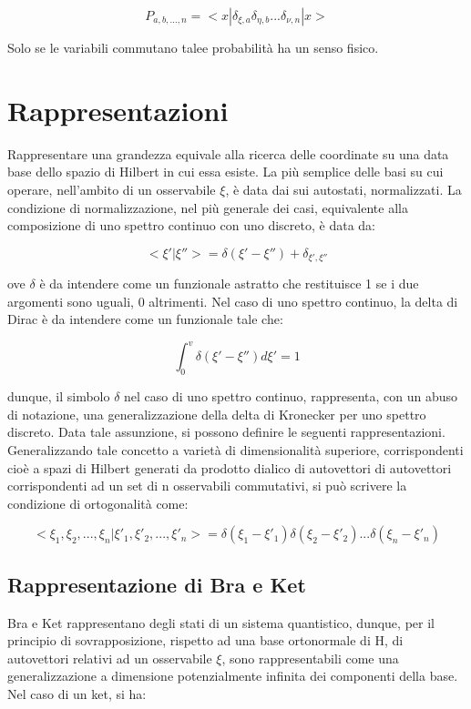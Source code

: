 \documentclass{article}
\begin{document}
\begin{equation}
  P_{a,b,...,n}=<x|\delta_{\xi,a}\delta_{\eta,b}...\delta_{\nu,n}|x>
\end{equation}

Solo se le variabili commutano talee probabilità ha un senso fisico.


\section{Rappresentazioni}
Rappresentare una grandezza equivale alla ricerca delle coordinate su una data base dello spazio di Hilbert in cui essa esiste.
La più semplice delle basi su cui operare, nell'ambito di un osservabile $\xi$, è data dai sui autostati, normalizzati.
La condizione di normalizzazione, nel più generale dei casi, equivalente alla composizione di uno spettro continuo con uno discreto, è data da:

\begin{equation}
<\xi'|\xi''> = \delta(\xi'-\xi'') + \delta_{\xi',\xi''}
\end{equation}

ove $\delta$ è da intendere come un funzionale astratto che restituisce 1 se i due argomenti sono uguali, 0 altrimenti.
Nel caso di uno spettro continuo, la delta di Dirac è da intendere come un funzionale tale che:

\begin{equation}
\int_{0}^{v} \delta(\xi'-\xi'')d\xi' = 1
\end{equation}

dunque, il simbolo $\delta$ nel caso di uno spettro continuo, rappresenta, con un abuso di notazione, una generalizzazione della delta di Kronecker per uno spettro discreto.
Data tale assunzione, si possono definire le seguenti rappresentazioni.
Generalizzando tale concetto a varietà di dimensionalità superiore, corrispondenti cioè a spazi di Hilbert generati da prodotto dialico
di autovettori di autovettori corrispondenti ad un set di n osservabili commutativi, si può scrivere la condizione di ortogonalità come:

\begin{equation}
    <\xi_1,\xi_2,...,\xi_n|\xi'_1,\xi'_2,...,\xi'_n> = \delta(\xi_1-\xi'_1)\delta(\xi_2-\xi'_2)...\delta(\xi_n-\xi'_n)
\end{equation}

\subsection{Rappresentazione di Bra e Ket}
Bra e Ket rappresentano degli stati di un sistema quantistico, dunque, per il principio di sovrapposizione,
rispetto ad una base ortonormale di H, di autovettori relativi ad un osservabile $\xi$, sono rappresentabili come
una generalizzazione a dimensione potenzialmente infinita dei componenti della base.
Nel caso di un ket, si ha:
\end{document}

